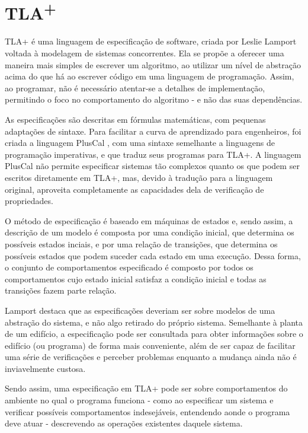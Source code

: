 \chapter{TLA\textsuperscript{+}}
\label{cap2}

TLA+ é uma linguagem de especificação de software, criada por Leslie Lamport \cite{tlahistory} voltada à modelagem de sistemas concorrentes. Ela se propõe a oferecer uma maneira mais simples de escrever um algoritmo, ao utilizar um nível de abstração acima do que há ao escrever código em uma linguagem de programação. Assim, ao programar, não é necessário atentar-se a detalhes de implementação, permitindo o foco no comportamento do algoritmo - e não das suas dependências.

As especificações são descritas em fórmulas matemáticas, com pequenas adaptações de sintaxe. Para facilitar a curva de aprendizado para engenheiros, foi criada a linguagem PlusCal \cite{pluscal}, com uma sintaxe semelhante a linguagens de programação imperativas, e que traduz seus programas para TLA+. A linguagem PlusCal não permite especificar sistemas tão complexos quanto os que podem ser escritos diretamente em TLA+, mas, devido à tradução para a linguagem original, aproveita completamente as capacidades dela de verificação de propriedades.

O método de especificação é baseado em máquinas de estados \cite{tlahistory} e, sendo assim, a descrição de um modelo é composta por uma condição inicial, que determina os possíveis estados inciais, e por uma relação de transições, que determina os possíveis estados que podem suceder cada estado em uma execução. Dessa forma, o conjunto de comportamentos especificado é composto por todos os comportamentos cujo estado inicial satisfaz a condição inicial e todas as transições fazem parte relação.

Lamport destaca \cite{hyperbook} que as especificações deveriam ser sobre modelos de uma abstração do sistema, e não algo retirado do próprio sistema. Semelhante à planta de um edifício, a especificação pode ser consultada para obter informações sobre o edifício (ou programa) de forma mais conveniente, além de ser capaz de facilitar uma série de verificações e perceber problemas enquanto a mudança ainda não é inviavelmente custosa.

Sendo assim, uma especificação em TLA+ pode ser sobre comportamentos do ambiente no qual o programa funciona - como ao especificar um sistema e verificar possíveis comportamentos indesejáveis, entendendo aonde o programa deve atuar - descrevendo as operações existentes daquele sistema.


